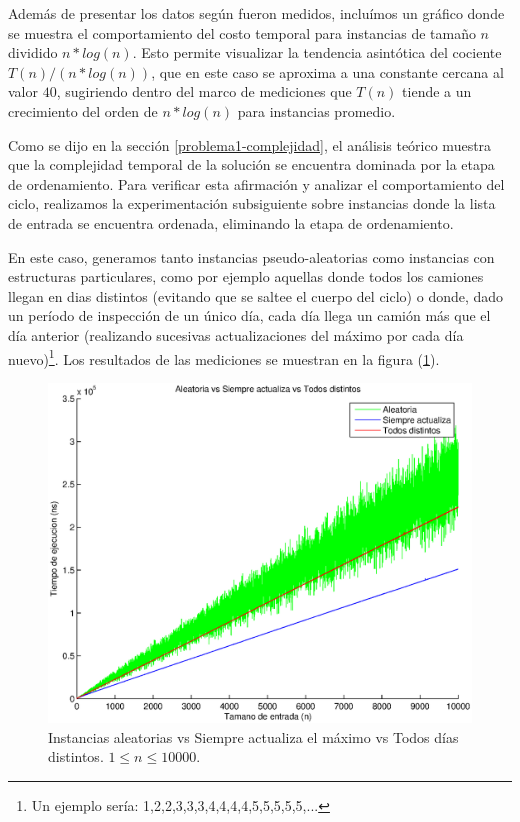 Además de presentar los datos según fueron medidos, incluímos un gráfico donde se muestra el comportamiento del costo temporal para instancias de tamaño $n$ dividido $n * log(n)$. Esto permite visualizar la tendencia asintótica del cociente $T(n) / (n * log(n))$, que en este caso se aproxima a una constante cercana al valor $40$, sugiriendo dentro del marco de mediciones que $T(n)$ tiende a un crecimiento del orden de $n * log(n)$ para instancias promedio.

Como se dijo en la sección \ref{problema1-complejidad}, el análisis teórico muestra que la complejidad temporal de la solución se encuentra dominada por la etapa de ordenamiento. Para verificar esta afirmación y analizar el comportamiento del ciclo, realizamos la experimentación subsiguiente sobre instancias donde la lista de entrada se encuentra ordenada, eliminando la etapa de ordenamiento.

En este caso, generamos tanto instancias pseudo-aleatorias como instancias con estructuras particulares, como por ejemplo aquellas donde todos los camiones llegan en dias distintos (evitando que se saltee el cuerpo del ciclo) o donde, dado un período de inspección de un único día, cada día llega un camión más que el día anterior (realizando sucesivas actualizaciones del máximo por cada día nuevo)\footnote{Un ejemplo sería: 1,2,2,3,3,3,4,4,4,4,5,5,5,5,5,...}. Los resultados de las mediciones se muestran en la figura (\ref{fig:problema1-ordenadas-comparacion}).

  \begin{figure}[H]
    \begin{center}
    \includegraphics[width=0.6\linewidth]{problema1/graficos/problema1_ordenada_aleatoria_10000_vs_problema1_ordenada_siempre_actualiza_10000_vs_problema1_ordenada_todos_distintos_10000.eps}
    \end{center}
    \caption{Instancias aleatorias vs Siempre actualiza el máximo vs Todos días distintos. $1 \leq n \leq 10000$.}
    \label{fig:problema1-ordenadas-comparacion}
  \end{figure}

